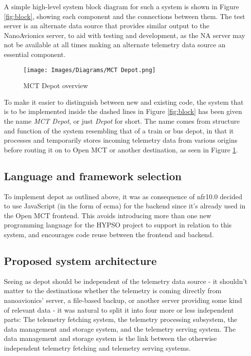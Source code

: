 A simple high-level system block diagram for such a system is shown in Figure \ref{fig:block}, showing each component and the connections between them. The test server is an alternate data source that provides similar output to the NanoAvionics server, to aid with testing and development, as the NA server may not be available at all times making an alternate telemetry data source an essential component.

\begin{figure}[H]
  \centering
  \texttt{[image: Images/Diagrams/MCT Depot.png]}
  \caption{MCT Depot overview}
  \label{fig:mctdepot}
\end{figure}

To make it easier to distinguish between new and existing code, the system that is to be implemented inside the dashed lines in Figure \ref{fig:block} has been given the name \emph{MCT Depot}, or just \emph{Depot} for short. The name comes from structure and function of the system resembling that of a train or bus depot, in that it processes and temporarily stores incoming telemetry data from various origins before routing it on to Open MCT or another destination, as seen in Figure \ref{fig:mctdepot}.

\subsection{Language and framework selection}
To implement \Gls{depot} as outlined above, it was as consequence of \acrshort{nfr}10.0 decided to use JavaScript (in the form of \Gls{ecma}) for the \gls{backend} since it’s already used in the Open MCT \gls{frontend}. This avoids introducing more than one new programming language for the HYPSO project to support in relation to this system, and encourages code reuse between the \gls{frontend} and \gls{backend}.

\subsection{Proposed system architecture}
Seeing as \Gls{depot} should be independent of the telemetry data source - it shouldn't matter to the destinations whether the telemetry is coming directly from \Gls{nanoavionics}’ server, a file-based backup, or another server providing some kind of relevant data - it was natural to split it into four more or less independent parts: The telemetry fetching system, the telemetry processing subsystem, the data management and storage system, and the telemetry serving system. The data management and storage system is the link between the otherwise independent telemetry fetching and telemetry serving systems.

